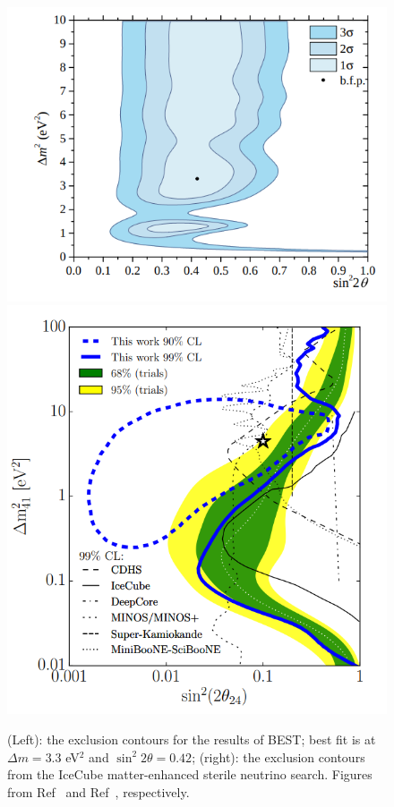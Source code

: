 \documentclass[main.tex]{subfiles}
\begin{document}
\begin{figure}
    \centering
    \includegraphics[height=0.2\paperheight]{figures/best_result.png}%
    \includegraphics[height=0.205\paperheight]{figures/icecube_prl_result.png}
    \caption{(Left): the exclusion contours for the results of BEST; best fit is at $\Delta m=3.3$ eV$^{2}$ and $\sin^{2}2\theta=0.42$; (right): the exclusion contours from the IceCube matter-enhanced sterile neutrino search. Figures from Ref~\cite{barinov2021results} and Ref~\cite{Aartsen_2020}, respectively.}\label{fig:best_Results}
\end{figure}
\end{document}
